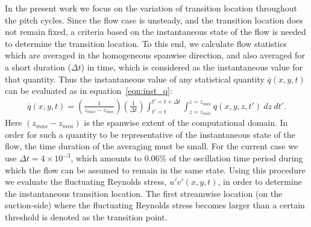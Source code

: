 In the present work we focus on the variation of transition location throughout the pitch cycles. Since the flow case is unsteady, and the transition location does not remain fixed, a criteria based on the instantaneous state of the flow is needed to determine the transition location. To this end, we calculate flow statistics which are averaged in the homogeneous spanwise direction, and also averaged for a short duration ($\Delta t$) in time, which is considered as the instantaneous value for that quantity. Thus the instantaneous value of any statistical quantity $\overline{q}(x,y,t)$ can be evaluated as in equation~\ref{eqn:inst_q}:
\begin{align}
	\overline{q}(x,y,t) = \left(\frac{1}{z_{max}-z_{min}}\right)\left(\frac{1}{\Delta t}\right)\int_{t'=t}^{t'=t+\Delta t}\int_{z=z_{min}}^{z=z_{max}}q(x,y,z,t')\ dz\ dt'.
	\label{eqn:inst_q}
\end{align}
Here $(z_{max}-z_{min})$ is the spanwise extent of the computational domain. In order for such a quantity to be representative of the instantaneous state of the flow, the time duration of the averaging must be small. For the current case we use $\Delta t=4\times10^{-3}$, which amounts to $0.06\%$ of the oscillation time period during which the flow can be assumed to remain in the same state. Using this procedure we evaluate the fluctuating Reynolds stress, $\overline{u'v'}(x,y,t)$, in order to determine the instantaneous transition location. The first streamwise location (on the suction-side) where the fluctuating Reynolds stress becomes larger than a certain threshold is denoted as the transition point. 
